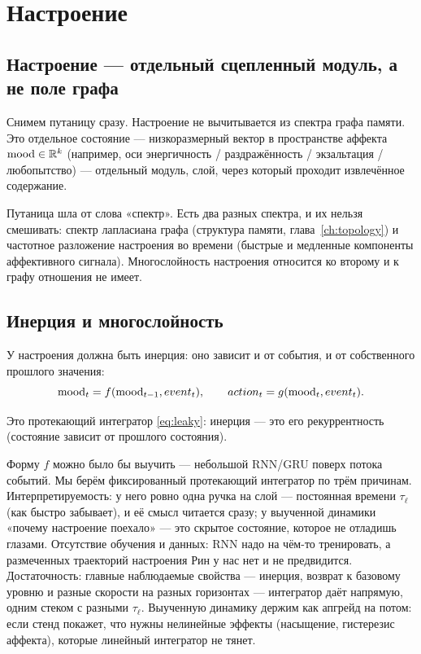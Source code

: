 \chapter{Настроение}
\label{ch:mood}

\section{Настроение --- отдельный сцепленный модуль, а не поле графа}

Снимем путаницу сразу. Настроение не вычитывается из спектра графа памяти.
Это отдельное состояние --- низкоразмерный вектор в пространстве аффекта
$\mathrm{mood} \in \mathbb{R}^k$ (например, оси энергичность / раздражённость /
экзальтация / любопытство) --- отдельный модуль, слой, через который проходит
извлечённое содержание.

Путаница шла от слова «спектр». Есть два разных спектра, и их нельзя
смешивать: спектр лапласиана графа (структура памяти, глава~\ref{ch:topology})
и частотное разложение настроения во времени (быстрые и медленные компоненты
аффективного сигнала). Многослойность настроения относится ко второму и к
графу отношения не имеет.

\section{Инерция и многослойность}

У настроения должна быть инерция: оно зависит и от события, и от собственного
прошлого значения:
\begin{equation}
\mathrm{mood}_t = f(\mathrm{mood}_{t-1}, event_t), \qquad action_t = g(\mathrm{mood}_t, event_t).
\label{eq:moodinertia}
\end{equation}

Это протекающий интегратор \eqref{eq:leaky}: инерция --- это его
рекуррентность (состояние зависит от прошлого состояния).

\begin{openq}
Форму $f$ можно было бы выучить --- небольшой RNN/GRU поверх потока событий.
Мы берём фиксированный протекающий интегратор по трём причинам.
Интерпретируемость: у него ровно одна ручка на слой --- постоянная времени
$\tau_\ell$ (как быстро забывает), и её смысл читается сразу; у выученной
динамики «почему настроение поехало» --- это скрытое состояние, которое не
отладишь глазами. Отсутствие обучения и данных: RNN надо на чём-то
тренировать, а размеченных траекторий настроения Рин у нас нет и не
предвидится. Достаточность: главные наблюдаемые свойства --- инерция, возврат
к базовому уровню и разные скорости на разных горизонтах --- интегратор даёт
напрямую, одним стеком с разными $\tau_\ell$. Выученную динамику держим как
апгрейд на потом: если стенд покажет, что нужны нелинейные эффекты
(насыщение, гистерезис аффекта), которые линейный интегратор не тянет.
\end{openq}


